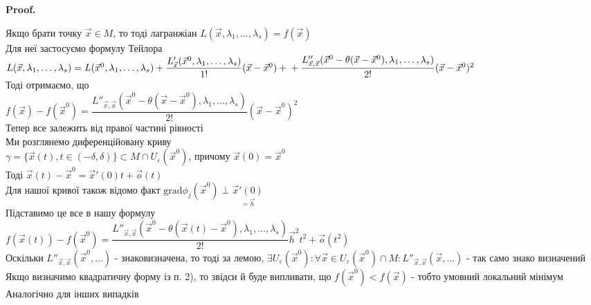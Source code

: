 \documentclass[a4paper, 10pt]{article}
\makeatletter
\def\qed{$\blacksquare$}
\theoremstyle{theoremdd}
\theoremstyle{theoremdd}
\theoremstyle{theoremdd}
\theoremstyle{theoremdd}
\theoremstyle{theoremdd}
\theoremstyle{theoremdd}
\theoremstyle{theoremdd}
\theoremstyle{theoremdd}
\theoremstyle{theoremdd}
\renewenvironment{proof}[1][Proof.\\]{\par
\pushQED{\hfill \qed}%
\normalfont \topsep6\p@\@plus6\p@\relax
\trivlist
\item\relax
{\bfseries
#1\@addpunct{.}}\hspace\labelsep\ignorespaces
}{%
\popQED\endtrivlist\@endpefalse
}
\makeatother
\begin{document}
\begin{proof}
Якщо брати точку $\vec{x} \in M$, то тоді лагранжіан $L(\vec{x}, \lambda_1, \dots, \lambda_s) = f(\vec{x})$\\
Для неї застосуємо формулу Тейлора\\
$L(\vec{x}, \lambda_1, \dots, \lambda_s) = L(\vec{x}^0, \lambda_1,\dots,\lambda_s) + \dfrac{L'_{\vec{x}}(\vec{x}^0,\lambda_1,\dots,\lambda_s)}{1!}(\vec{x}-\vec{x}^0) + \\ + \dfrac{L''_{\vec{x},\vec{x}}(\vec{x}^0 - \theta(\vec{x}-\vec{x}^0), \lambda_1,\dots,\lambda_s)}{2!}(\vec{x}-\vec{x}^0)^2$\\
Тоді отримаємо, що\\
$f(\vec{x})-f(\vec{x}^0) = \dfrac{L''_{\vec{x},\vec{x}}(\vec{x}^0 - \theta(\vec{x}-\vec{x}^0), \lambda_1,\dots,\lambda_s)}{2!}(\vec{x}-\vec{x}^0)^2$\\
Тепер все залежить від правої частині рівності\\
Ми розглянемо диференційовану криву \\ $\gamma = \{\vec{x}(t), t \in (-\delta,\delta) \} \subset M \cap U_{\varepsilon}(\vec{x}^0)$, причому $\vec{x}(0)=\vec{x}^0$\\
Тоді $\vec{x}(t) - \vec{x}^0 = \vec{x}'(0)t + \vec{o}(t)$\\
Для нашої кривої також відомо факт $\textrm{grad} \phi_j (\vec{x}^0) \perp \underset{=\vec{h}}{\vec{x}'(0)}$\\
Підставимо це все в нашу формулу\\
$f(\vec{x}(t)) -f(\vec{x}^0) = \dfrac{L''_{\vec{x},\vec{x}}(\vec{x}^0 - \theta(\vec{x}(t)-\vec{x}^0), \lambda_1,\dots,\lambda_s)}{2!}\vec{h}^2 t^2 + \vec{o}(t^2)$\\
Оскільки $L''_{\vec{x},\vec{x}}(\vec{x}^0,\dots)$ - знаковизначена, то тоді за лемою, $\exists U_{\varepsilon}(\vec{x}^0): \forall \vec{x} \in U_{\varepsilon}(\vec{x}^0) \cap M: L''_{\vec{x},\vec{x}}(\vec{x},\dots)$ - так само знако визначений\\
Якщо визначимо квадратичну форму із п. 2), то звідси й буде випливати, що $f(\vec{x}^0) < f(\vec{x})$ - тобто умовний локальний мінімум\\
Аналогічно для інших випадків
\end{proof}
\end{document}
